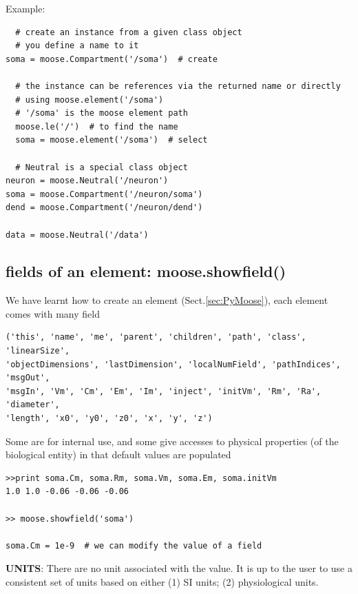 Example: 
\begin{lstlisting}
  # create an instance from a given class object
  # you define a name to it
soma = moose.Compartment('/soma')  # create

  # the instance can be references via the returned name or directly
  # using moose.element('/soma')
  # '/soma' is the moose element path
  moose.le('/')  # to find the name
  soma = moose.element('/soma')  # select
  
  # Neutral is a special class object
neuron = moose.Neutral('/neuron')
soma = moose.Compartment('/neuron/soma')
dend = moose.Compartment('/neuron/dend')

data = moose.Neutral('/data')  
\end{lstlisting}


\subsection{fields of an element: moose.showfield()}

We have learnt how to create an element (Sect.\ref{sec:PyMoose}), each element
comes with many field
\begin{verbatim}
('this', 'name', 'me', 'parent', 'children', 'path', 'class', 'linearSize', 
'objectDimensions', 'lastDimension', 'localNumField', 'pathIndices', 'msgOut', 
'msgIn', 'Vm', 'Cm', 'Em', 'Im', 'inject', 'initVm', 'Rm', 'Ra', 'diameter', 
'length', 'x0', 'y0', 'z0', 'x', 'y', 'z')
\end{verbatim}
Some are for internal use, and some give accesses to physical properties (of
the biological entity) in that default values are populated
\begin{verbatim}
>>print soma.Cm, soma.Rm, soma.Vm, soma.Em, soma.initVm 
1.0 1.0 -0.06 -0.06 -0.06

>> moose.showfield('soma')

soma.Cm = 1e-9  # we can modify the value of a field
\end{verbatim}

{\bf UNITS}: There are no unit associated with the value. It is up to the user
to use a consistent set of units based on either (1) SI units; (2) physiological
units.


